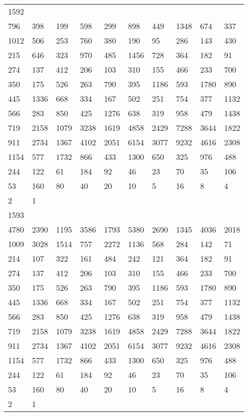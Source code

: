 \begin{longtable}{*{10}{l}}
1592&&&&&&&&&\\
796& 398& 199& 598& 299& 898& 449& 1348& 674& 337\\
1012& 506& 253& 760& 380& 190& 95& 286& 143& 430\\
215& 646& 323& 970& 485& 1456& 728& 364& 182& 91\\
274& 137& 412& 206& 103& 310& 155& 466& 233& 700\\
350& 175& 526& 263& 790& 395& 1186& 593& 1780& 890\\
445& 1336& 668& 334& 167& 502& 251& 754& 377& 1132\\
566& 283& 850& 425& 1276& 638& 319& 958& 479& 1438\\
719& 2158& 1079& 3238& 1619& 4858& 2429& 7288& 3644& 1822\\
911& 2734& 1367& 4102& 2051& 6154& 3077& 9232& 4616& 2308\\
1154& 577& 1732& 866& 433& 1300& 650& 325& 976& 488\\
244& 122& 61& 184& 92& 46& 23& 70& 35& 106\\
53& 160& 80& 40& 20& 10& 5& 16& 8& 4\\
2& 1& \\

1593&&&&&&&&&\\
4780& 2390& 1195& 3586& 1793& 5380& 2690& 1345& 4036& 2018\\
1009& 3028& 1514& 757& 2272& 1136& 568& 284& 142& 71\\
214& 107& 322& 161& 484& 242& 121& 364& 182& 91\\
274& 137& 412& 206& 103& 310& 155& 466& 233& 700\\
350& 175& 526& 263& 790& 395& 1186& 593& 1780& 890\\
445& 1336& 668& 334& 167& 502& 251& 754& 377& 1132\\
566& 283& 850& 425& 1276& 638& 319& 958& 479& 1438\\
719& 2158& 1079& 3238& 1619& 4858& 2429& 7288& 3644& 1822\\
911& 2734& 1367& 4102& 2051& 6154& 3077& 9232& 4616& 2308\\
1154& 577& 1732& 866& 433& 1300& 650& 325& 976& 488\\
244& 122& 61& 184& 92& 46& 23& 70& 35& 106\\
53& 160& 80& 40& 20& 10& 5& 16& 8& 4\\
2& 1& \\


\end{longtable}

